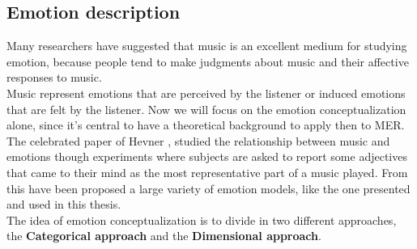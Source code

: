 \subsection{Emotion description}
Many researchers have suggested that music is an excellent medium for studying emotion, because people tend to make judgments about music and their affective responses to music.
\\
Music represent emotions that are perceived by the listener or induced emotions that are felt by the listener. Now we will focus on the emotion conceptualization alone, since it's central to have a theoretical background to apply then to MER.
\\
The celebrated paper of Hevner \cite{hevner1935expression} , studied the relationship between music and emotions though experiments where subjects are asked to report some adjectives that came to their mind as the most representative part of a music played. From this have been proposed a large variety of emotion models, like the one presented and used in this thesis.
\\ \indent
The idea of emotion conceptualization is to divide in two different approaches, the \textbf{Categorical approach} and the \textbf{Dimensional approach}.

